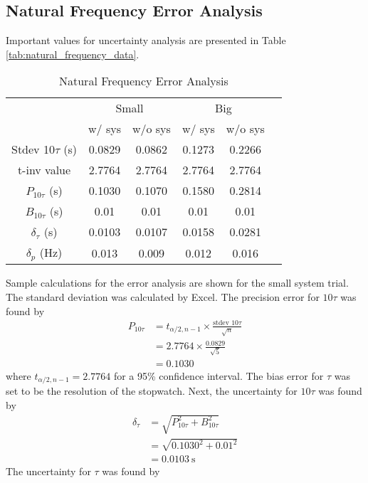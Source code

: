 \subsection{Natural Frequency Error Analysis}
Important values for uncertainty analysis are presented in Table \ref{tab:natural_frequency_data}.  
\begin{table}[h]
    \centering
    \caption{Natural Frequency Error Analysis}
    \label{tab:natural_frequency_error_analysis}
    \begin{tabular}{cccccc}
    \toprule
        & \multicolumn{2}{c}{Small} & \multicolumn{2}{c}{Big} \\
        \cmidrule(lr){2-3} \cmidrule(lr){4-5}
        & w/ sys & w/o sys & w/ sys & w/o sys \\
        \midrule
        Stdev 10$\tau$ (s) & 0.0829 & 0.0862 & 0.1273 & 0.2266 \\
        t-inv value & 2.7764 & 2.7764 & 2.7764 & 2.7764 \\
        $P_{10\tau}$ (s) & 0.1030 & 0.1070 & 0.1580 & 0.2814 \\
        $B_{10\tau}$ (s)& 0.01 & 0.01 & 0.01 & 0.01 \\
        $\delta_{\tau}$ (s) & 0.0103 & 0.0107 & 0.0158 & 0.0281 \\
        $\delta_p$ (Hz) & 0.013 & 0.009 & 0.012 & 0.016 \\
        \bottomrule
    \end{tabular}
\end{table}
Sample calculations for the error analysis are shown for the small system trial. The standard deviation was calculated by Excel. The precision error for $10\tau$ was found by
\begin{align*}
    P_{10\tau} &= t_{\alpha/2, n-1} \times \frac{\text{stdev } 10\tau}{\sqrt{n}} \\
    &= 2.7764 \times \frac{0.0829}{\sqrt{5}} \\
    &= 0.1030
\end{align*}
where $t_{\alpha/2, n-1} = 2.7764$ for a 95\% confidence interval. The bias error for $\tau$ was set to be the resolution of the stopwatch. Next, the uncertainty for $10\tau$ was found by
\begin{align*}
    \delta_{\tau} &= \sqrt{P_{10\tau}^2 + B_{10\tau}^2} \\
    &= \sqrt{0.1030^2 + 0.01^2} \\
    &= \qty{0.0103}{\second}
\end{align*}
The uncertainty for $\tau$ was found by

